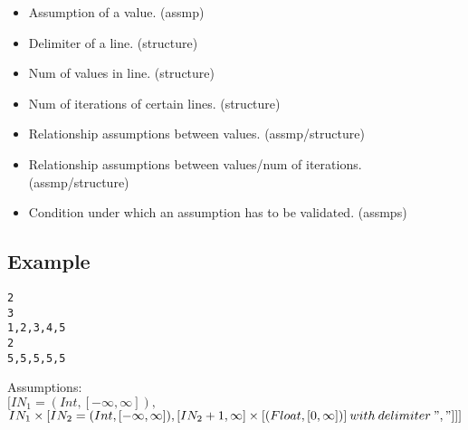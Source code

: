 \documentclass[11pt]{article}
\begin{document}
\begin{itemize}
  \item Assumption of a value. (assmp)
  \item Delimiter of a line. (structure)
  \item Num of values in line. (structure)
  \item Num of iterations of certain lines. (structure)
  \item Relationship assumptions between values. (assmp/structure)
  \item Relationship assumptions between values/num of iterations. (assmp/structure)
  \item Condition under which an assumption has to be validated. (assmps)
\end{itemize}

\subsection{Example}

\begin{lstlisting}
2
3
1,2,3,4,5
2
5,5,5,5,5
\end{lstlisting}

Assumptions:\\
$[IN_1 = (Int, [-\infty, \infty]),$\\
$IN_1 \times [IN_2 = (Int, [-\infty, \infty]), [IN_2+1, \infty] \times [(Float, [0, \infty])] \:with\:delimiter\:","]]]$\\
\end{document}
